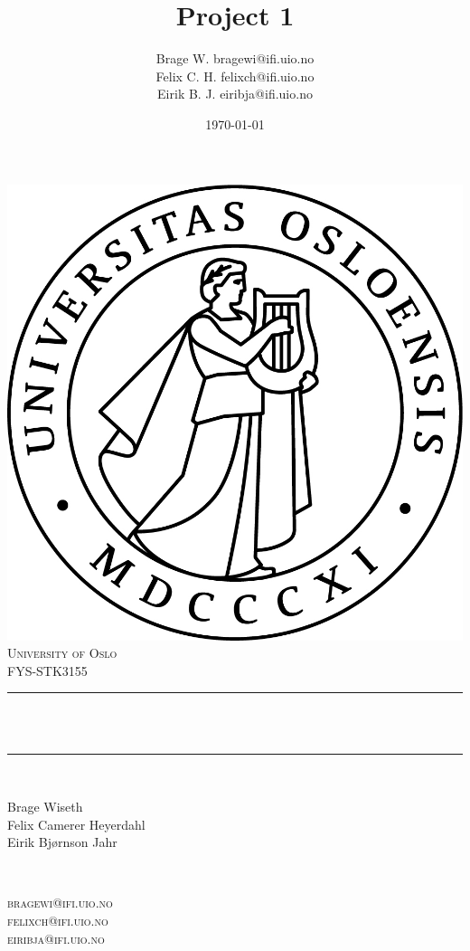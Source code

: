 \documentclass[twoside,11pt]{report}
\title{{\huge Project 1}}
\author{\name Brage W. \email bragewi@ifi.uio.no\\
       \name Felix C. H.  \email felixch@ifi.uio.no \\
       \name Eirik B. J. \email eiribja@ifi.uio.no}
\date{\today}											%
\begin{document}

\begin{titlepage}
	\centering
    \vspace*{0.5 cm}
    \includegraphics[scale = 0.75]{uio.jpg}\\[1.0 cm]	%
    \textsc{\LARGE University of Oslo}\\[2.0 cm]	    %
	\textsc{\Large FYS-STK3155}\\[0.5 cm]				%
	\rule{\linewidth}{0.2 mm} \\[0.4 cm]
	{ \huge \bfseries \@title}\\
	\rule{\linewidth}{0.2 mm} \\[1.5 cm]

	\begin{minipage}{0.4\textwidth}
		\begin{flushleft} \normalsize
            Brage Wiseth\\
            Felix Camerer Heyerdahl\\
            Eirik Bjørnson Jahr\\
			\end{flushleft}
			\end{minipage}~
			\begin{minipage}{0.4\textwidth}
			\begin{flushright} \normalsize
        \textsc{
          bragewi@ifi.uio.no\\
          felixch@ifi.uio.no\\
          eiribja@ifi.uio.no\\
        }
		\end{flushright}
        

\end{minipage}
\end{titlepage}
\end{document}

